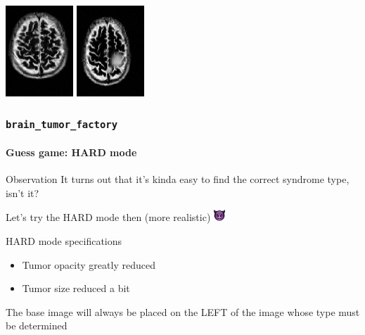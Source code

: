 \documentclass[]{beamer}
\newcommand{\btf}{\tt{brain\_tumor\_factory}}
\begin{document}
\begin{frame}
\begin{minipage}{\linewidth}
\begin{center}
      \includegraphics[width=2.55cm]{resources/c3e}
      \includegraphics[width=2.55cm]{resources/a4e}
    \end{center}
  \end{minipage}
\end{frame}

\begin{frame}
  \frametitle{\btf}
  \framesubtitle{Guess game: HARD mode}
  \begin{block}{Observation}
    It turns out that it's kinda easy to find the correct syndrome type, isn't it?

    Let's try the \alert{HARD} mode then (more realistic) \includegraphics[height=12pt]{resources/devil}
  \end{block}

  \begin{exampleblock}{HARD mode specifications}
    \begin{itemize}
      \item Tumor opacity \alert{greatly} reduced
      \item Tumor size reduced a bit
    \end{itemize}
  \end{exampleblock}

  The \alert{base image} will always be placed on the \alert{LEFT} of the image whose type must be determined
\end{frame}
\end{document}
